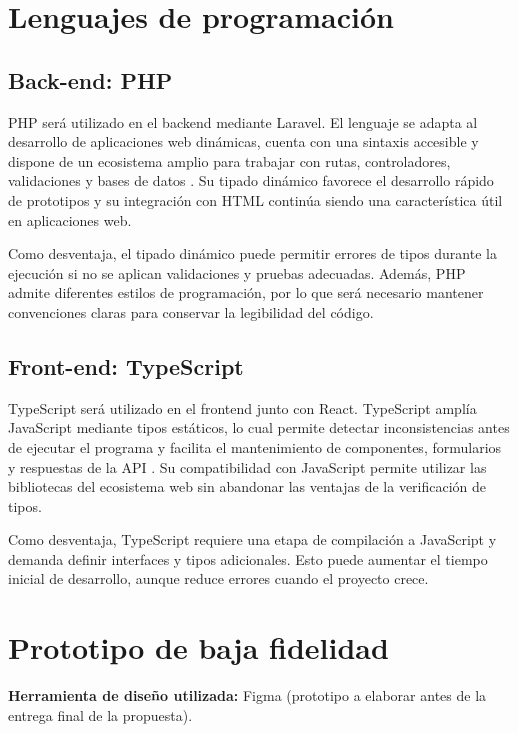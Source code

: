 \documentclass[12pt]{article}
\begin{document}
\section{Lenguajes de programación}

\subsection{Back-end: PHP}

PHP será utilizado en el backend mediante Laravel. El lenguaje se adapta al desarrollo de aplicaciones web dinámicas, cuenta con una sintaxis accesible y dispone de un ecosistema amplio para trabajar con rutas, controladores, validaciones y bases de datos \cite{php}. Su tipado dinámico favorece el desarrollo rápido de prototipos y su integración con HTML continúa siendo una característica útil en aplicaciones web.

Como desventaja, el tipado dinámico puede permitir errores de tipos durante la ejecución si no se aplican validaciones y pruebas adecuadas. Además, PHP admite diferentes estilos de programación, por lo que será necesario mantener convenciones claras para conservar la legibilidad del código.

\subsection{Front-end: TypeScript}

TypeScript será utilizado en el frontend junto con React. TypeScript amplía JavaScript mediante tipos estáticos, lo cual permite detectar inconsistencias antes de ejecutar el programa y facilita el mantenimiento de componentes, formularios y respuestas de la API \cite{typescript}. Su compatibilidad con JavaScript permite utilizar las bibliotecas del ecosistema web sin abandonar las ventajas de la verificación de tipos.

Como desventaja, TypeScript requiere una etapa de compilación a JavaScript y demanda definir interfaces y tipos adicionales. Esto puede aumentar el tiempo inicial de desarrollo, aunque reduce errores cuando el proyecto crece.

\section{Prototipo de baja fidelidad}

\textbf{Herramienta de diseño utilizada:} Figma (prototipo a elaborar antes de la entrega final de la propuesta).
\end{document}
